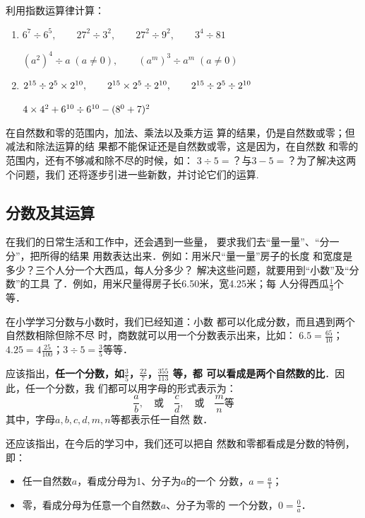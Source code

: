 \begin{ex}
	利用指数运算律计算：
	\begin{enumerate}
		\item $6^7\div 6^5,\qquad 27^2\div 3^2,\qquad 27^2\div 9^2,\qquad 3^4\div 81$
		
		$(a^2)^4\div a\; (a\ne 0),\qquad (a^m)^3\div a^m\; (a\ne 0)$
		\item $2^{15}\div 2^5\times 2^{10},\qquad 2^{15}\times 2^5\div 2^{10},\qquad 2^{15}\div 2^5\div 2^{10}$
		
		$4\times 4^2 +6^{10}\div 6^{10}-(8^0+7)^2$
	\end{enumerate}
\end{ex}

在自然数和零的范围内，加法、乘法以及乘方运
算的结果，仍是自然数或零；但减法和除法运算的结
果都不能保证还是自然数或零，这是因为，在自然数
和零的范围内，还有不够减和除不尽的时候，如：
$3\div 5=$？与$3-5=$？为了解决这两个问题，我们
还将逐步引进一些新数，并讨论它们的运算.

\subsection{分数及其运算}

在我们的日常生活和工作中，还会遇到一些量，
要求我们去“量一量”、“分一分”，把所得的结果
用数表达出来．例如：用米尺“量一量”房子的长度
和宽度是多少？三个人分一个大西瓜，每人分多少？
解决这些问题，就要用到“小数”及“分数”的工具
了．例如，用米尺量得房子长6.50米，宽4.25米；每
人分得西瓜$\frac{1}{3}$个等．

在小学学习分数与小数时，我们已经知道：小数
都可以化成分数，而且遇到两个自然数相除但除不尽
时，商数就可以用一个分数表示出来，比如：
$6.5=\frac{65}{10}$；$4.25=4\frac{25}{100}$；$3\div 5=\frac{3}{5}$等等．

应该指出，\textbf{任一个分数，如$\frac{3}{5}$，$\frac{22}{7}$，$\frac{355}{113}$
	等，都
	可以看成是两个自然数的比}．因此，任一个分数，我
们都可以用字母的形式表示为：
\[\frac{a}{b},\quad \text{或}\quad \frac{c}{d}, \quad \text{或} \quad \frac{m}{n} \text{等} \]
其中，字母$a, b, c, d, m,n$等都表示任一自然
数．

还应该指出，在今后的学习中，我们还可以把自
然数和零都看成是分数的特例，即：
\begin{itemize}
	\item 任一自然数$a$，看成分母为1、分子为$a$的一个
	分数，$a=\frac{a}{1}$；
	\item 零，看成分母为任意一个自然数$a$、分子为零的
	一个分数，$0=\frac{0}{a}$．
\end{itemize}


